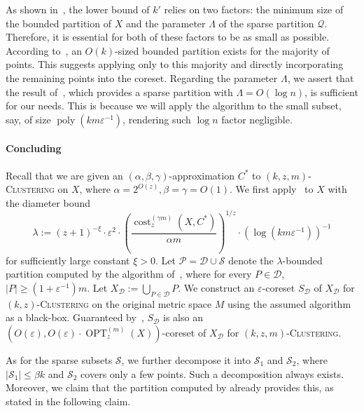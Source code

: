 \documentclass[letterpaper,11pt]{article}
\theoremstyle{plain}
\theoremstyle{definition}
\theoremstyle{remark}
\DeclareMathOperator{\poly}{poly}
\DeclareMathOperator{\cost}{cost}
\DeclareMathOperator{\OPT}{OPT}
\newcommand{\eps}{\varepsilon}
\newcommand{\calD}{\mathcal{D}}
\newcommand{\calP}{\mathcal{P}}
\newcommand{\calQ}{\mathcal{Q}}
\newcommand{\calS}{\mathcal{S}}
\newcommand{\ProblemName}[1]{\textsc{#1}}
\newcommand{\kzC}{\ProblemName{$(k,z)$-Clustering}\xspace}
\newcommand{\kzmC}{\ProblemName{$(k,z,m)$-Clustering}\xspace}
\begin{document}
As shown in~, the lower bound of $k'$ relies on two factors: the minimum size of the bounded partition of $X$ and the parameter $\Lambda$ of the sparse partition $\calQ$. Therefore, it is essential for both of these factors to be as small as possible.
According to~, an $O(k)$-sized bounded partition exists for the majority of points. This suggests applying  only to this majority and directly incorporating the remaining points into the coreset.
Regarding the parameter $\Lambda$, we assert that the result of~, which provides a sparse partition with $\Lambda = O(\log n)$, is sufficient for our needs. This is because we will apply the algorithm to the small subset, say, of size $\poly(km\eps^{-1})$, rendering such $\log n$ factor negligible.

\paragraph{Concluding~} 

Recall that we are given an $(\alpha,\beta,\gamma)$-approximation $C^*$ to \kzmC on $X$, where $\alpha = 2^{O(z)},\beta = \gamma = O(1)$. We first apply~ to $X$ with the diameter bound 
\begin{equation*}
    \lambda:= (z+1)^{-\xi}\cdot \eps^{2}\cdot \left(\frac{ \cost_z^{(\gamma m)}(X,C^*)}{\alpha m} \right)^{1/z}\cdot \left(\log(km\eps^{-1})\right)^{-1}
\end{equation*}
for sufficiently large constant $\xi > 0$. 
Let $\calP = \calD\cup \calS$ denote the $\lambda$-bounded partition computed by the algorithm of~, where for every $P\in\calD$, $|P|\ge (1+\eps^{-1})m$. Let $X_{\calD}:=\bigcup_{P\in\calD} P$.
We construct an $\eps$-coreset $S_{\calD}$ of $X_{\calD}$ for \kzC on the original metric space $M$ using the assumed algorithm as a black-box. Guaranteed by~, $S_\calD$ is also an $\left(O(\eps), O(\eps)\cdot \OPT_z^{(m)}(X)\right)$-coreset of $X_{\calD}$ for \kzmC.

As for the sparse subsets $\calS$, we further decompose it into $\calS_1$ and $\calS_2$, where $|\calS_1|\leq \beta k$ and $\calS_2$ covers only a few points. Such a decomposition always exists. Moreover, we claim that the partition computed by  already provides this, as stated in the following claim.
\end{document}
